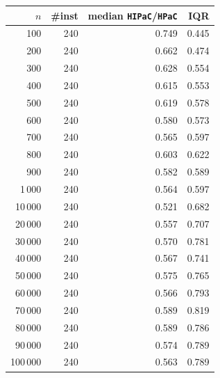 \begin{tabular}{@{}rrrr@{}}
\toprule
$n$ & \#inst & median \texttt{HIPaC}/\texttt{HPaC} & IQR \\
\midrule
100 & 240 & 0.749 & 0.445 \\
200 & 240 & 0.662 & 0.474 \\
300 & 240 & 0.628 & 0.554 \\
400 & 240 & 0.615 & 0.553 \\
500 & 240 & 0.619 & 0.578 \\
600 & 240 & 0.580 & 0.573 \\
700 & 240 & 0.565 & 0.597 \\
800 & 240 & 0.603 & 0.622 \\
900 & 240 & 0.582 & 0.589 \\
1\,000 & 240 & 0.564 & 0.597 \\
10\,000 & 240 & 0.521 & 0.682 \\
20\,000 & 240 & 0.557 & 0.707 \\
30\,000 & 240 & 0.570 & 0.781 \\
40\,000 & 240 & 0.567 & 0.741 \\
50\,000 & 240 & 0.575 & 0.765 \\
60\,000 & 240 & 0.566 & 0.793 \\
70\,000 & 240 & 0.589 & 0.819 \\
80\,000 & 240 & 0.589 & 0.786 \\
90\,000 & 240 & 0.574 & 0.789 \\
100\,000 & 240 & 0.563 & 0.789 \\
\bottomrule
\end{tabular}
